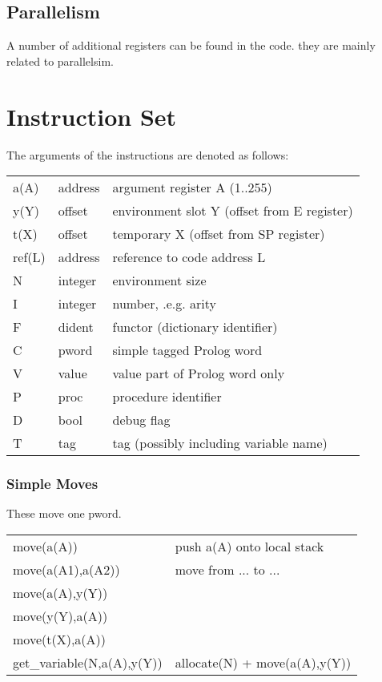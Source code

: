 \subsection{Parallelism}
A number of additional registers can be found in the code.
they are mainly related to parallelsim.


\section{Instruction Set}

The arguments of the instructions are denoted as follows:

\begin{tabular}{|l|l|l|}
\hline
a(A)            & address & argument register A (1..255)\\
y(Y)            & offset & environment slot Y (offset from E register)\\
t(X)            & offset & temporary X (offset from SP register)\\
ref(L)          & address & reference to code address L\\
N               & integer & environment size\\
I               & integer & number, .e.g. arity\\
F               & dident & functor (dictionary identifier)\\
C               & pword & simple tagged Prolog word\\
V               & value & value part of Prolog word only\\
P               & proc & procedure identifier\\
D               & bool & debug flag\\
T               & tag & tag (possibly including variable name) \\
\hline
\end{tabular}

\subsubsection{Simple Moves}
These move one pword.

\begin{tabular}{|l|l|}
\hline
move(a(A))              & push a(A) onto local stack \\
move(a(A1),a(A2))       & move from ... to ...  \\
move(a(A),y(Y))         &       \\
move(y(Y),a(A))         &       \\
move(t(X),a(A))         &       \\
\hline
get_variable(N,a(A),y(Y))& allocate(N) + move(a(A),y(Y))        \\
\hline
\end{tabular}

